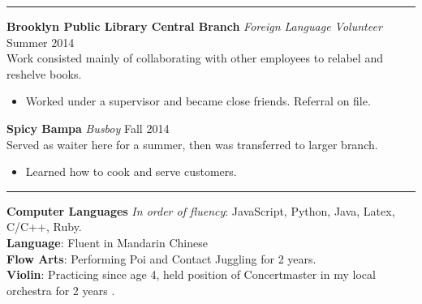 \documentclass[14, .75in]{article}
\begin{document}
  \vspace{0.1cm} \hrule \vspace{0.2cm}
  \noindent\textbf{Brooklyn Public Library Central Branch}\textit{ Foreign Language Volunteer}
  \hfill Summer 2014\\
  Work consisted mainly of collaborating with other employees to relabel and reshelve books.
  \begin{itemize}[label={--},noitemsep, topsep=0pt]
    \item Worked under a supervisor and became close friends. Referral on file.
  \end{itemize}
  \textbf{Spicy Bampa}\textit{ Busboy} \hfill Fall 2014\\
  Served as waiter here for a summer, then was transferred to larger branch.
  \begin{itemize}[label={--},noitemsep, topsep=0pt]
    \item Learned how to cook and serve customers.
  \end{itemize}



  \vspace{0.1cm} \hrule \vspace{0.2cm}
  \noindent\textbf{Computer Languages}\textit{ In order of fluency}:
  JavaScript, Python, Java, Latex, C/C++, Ruby.\\
  \noindent\textbf{Language}: Fluent in Mandarin Chinese\\
  \textbf{Flow Arts}: Performing Poi and Contact Juggling for 2 years.\\
  \textbf{Violin}: Practicing since age 4, held position of Concertmaster in my local orchestra for 2 years .
\end{document}
